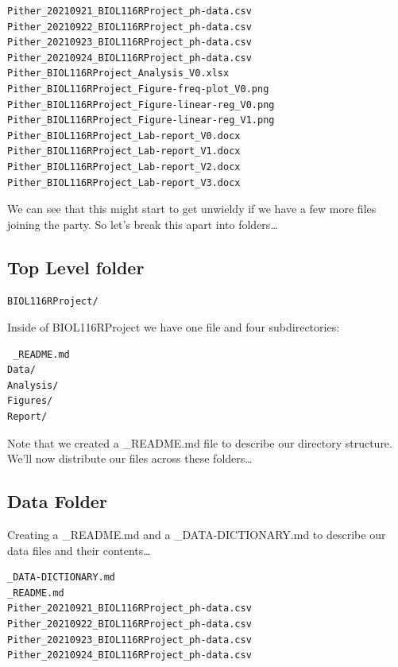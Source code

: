 \documentclass[
]{book}
\begin{document}
\begin{verbatim}
Pither_20210921_BIOL116RProject_ph-data.csv
Pither_20210922_BIOL116RProject_ph-data.csv
Pither_20210923_BIOL116RProject_ph-data.csv
Pither_20210924_BIOL116RProject_ph-data.csv
Pither_BIOL116RProject_Analysis_V0.xlsx
Pither_BIOL116RProject_Figure-freq-plot_V0.png
Pither_BIOL116RProject_Figure-linear-reg_V0.png
Pither_BIOL116RProject_Figure-linear-reg_V1.png
Pither_BIOL116RProject_Lab-report_V0.docx
Pither_BIOL116RProject_Lab-report_V1.docx
Pither_BIOL116RProject_Lab-report_V2.docx
Pither_BIOL116RProject_Lab-report_V3.docx
\end{verbatim}

We can see that this might start to get unwieldy if we have a few more files joining the party. So let's break this apart into folders\ldots{}

\subsection*{Top Level folder}\label{top-level-folder}

\begin{verbatim}
BIOL116RProject/
\end{verbatim}

Inside of BIOL116RProject we have one file and four subdirectories:

\begin{verbatim}
 _README.md
Data/ 
Analysis/
Figures/
Report/
\end{verbatim}

Note that we created a \_README.md file to describe our directory structure. We'll now distribute our files across these folders\ldots{}

\subsection*{Data Folder}\label{data-folder}

Creating a \_README.md and a \_DATA-DICTIONARY.md to describe our data files and their contents\ldots{}

\begin{verbatim}
_DATA-DICTIONARY.md
_README.md
Pither_20210921_BIOL116RProject_ph-data.csv
Pither_20210922_BIOL116RProject_ph-data.csv
Pither_20210923_BIOL116RProject_ph-data.csv
Pither_20210924_BIOL116RProject_ph-data.csv
\end{verbatim}
\end{document}
